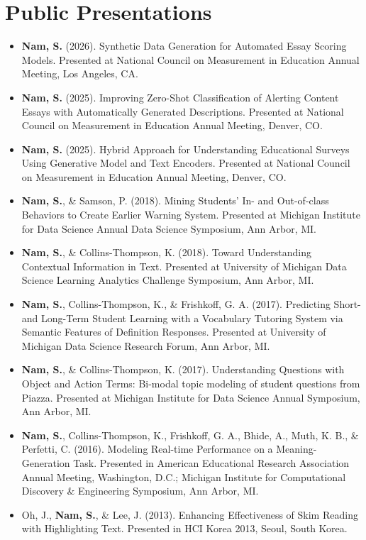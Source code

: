 \documentclass[11pt,a4paper]{article}
\begin{document}
\section*{Public Presentations}
\begin{itemize}
    \item \textbf{Nam, S.} (2026). Synthetic Data Generation for Automated Essay Scoring Models. Presented at National Council on Measurement in Education Annual Meeting, Los Angeles, CA.
    \item \textbf{Nam, S.} (2025). Improving Zero-Shot Classification of Alerting Content Essays with Automatically Generated Descriptions. Presented at National Council on Measurement in Education Annual Meeting, Denver, CO.
    \item \textbf{Nam, S.} (2025). Hybrid Approach for Understanding Educational Surveys Using Generative Model and Text Encoders. Presented at National Council on Measurement in Education Annual Meeting, Denver, CO.
    \item \textbf{Nam, S.}, \& Samson, P. (2018). Mining Students' In- and Out-of-class Behaviors to Create Earlier Warning System. Presented at Michigan Institute for Data Science Annual Data Science Symposium, Ann Arbor, MI.
    \item \textbf{Nam, S.}, \& Collins-Thompson, K. (2018). Toward Understanding Contextual Information in Text. Presented at University of Michigan Data Science Learning Analytics Challenge Symposium, Ann Arbor, MI.
    \item \textbf{Nam, S.}, Collins-Thompson, K., \& Frishkoff, G. A. (2017). Predicting Short- and Long-Term Student Learning with a Vocabulary Tutoring System via Semantic Features of Definition Responses. Presented at University of Michigan Data Science Research Forum, Ann Arbor, MI.
    \item \textbf{Nam, S.}, \& Collins-Thompson, K. (2017). Understanding Questions with Object and Action Terms: Bi-modal topic modeling of student questions from Piazza. Presented at Michigan Institute for Data Science Annual Symposium, Ann Arbor, MI.
    \item \textbf{Nam, S.}, Collins-Thompson, K., Frishkoff, G. A., Bhide, A., Muth, K. B., \& Perfetti, C. (2016). Modeling Real-time Performance on a Meaning-Generation Task. Presented in American Educational Research Association Annual Meeting, Washington, D.C.; Michigan Institute for Computational Discovery \& Engineering Symposium, Ann Arbor, MI.
    \item Oh, J., \textbf{Nam, S.}, \& Lee, J. (2013). Enhancing Effectiveness of Skim Reading with Highlighting Text. Presented in HCI Korea 2013, Seoul, South Korea.
\end{itemize}
\end{document}
